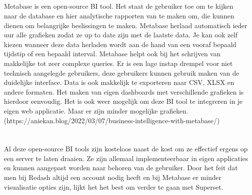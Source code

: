 \subsection{}%
\label{sec:metabase}
Metabase is een open-source BI tool. Het staat de gebruiker toe om te kijken naar de database en hier analytische rapporten van te maken om, die kunnen dienen om belangrijke beslissingen te maken. Metabase herlaad automatisch ieder uur alle grafieken zodat ze up to date zijn met de laatste data. Je kan ook zelf kiezen wanneer deze data herladen wordt aan de hand van een vooraf bepaald tijdstip of een bepaald interval. Metabase helpt ook bij het schrijven van makkelijke tot zeer complexe queries. Er is een lage instap drempel voor niet technisch aangelegde gebruikers, deze gebruikers kunnen gebruik maken van de duidelijke interface. Data is ook makkelijk te exporteren naar CSV, XLSX en andere formaten. Het maken van eigen dashboards met verschillende grafieken is hierdoor eenvoudig. Het is ook weer mogelijk om deze BI tool te integreren in je eigen web applicatie. Maar er zijn minder mogelijke grafieken.
(https://aniekan.blog/2022/03/07/business-intelligence-with-metabase/)


\section{}%
\label{sec:vergelijking}
Al deze open-source BI tools zijn kosteloos naast de kost om ze effectief ergens op een server te laten draaien. Ze zijn allemaal implementeerbaar in eigen applicaties en kunnen aangepast worden naar behoren van de gebruiker. Door het feit dat men bij Redash altijd een account nodig heeft en bij Metabase er minder visualisatie opties zijn, lijkt het het best om verder te gaan met Superset.


